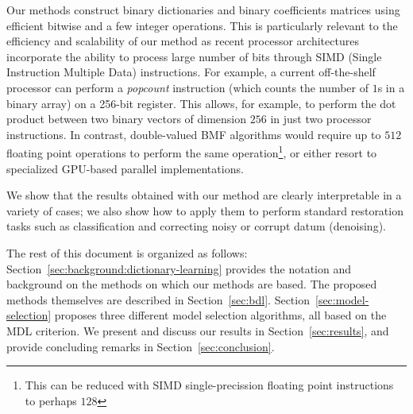 \documentclass[twocolumn]{IEEEtran}
\theoremstyle{definition}
\begin{document}
Our methods construct binary dictionaries and binary coefficients matrices using efficient bitwise and a few integer operations. This is particularly relevant to the efficiency and scalability of our method as recent processor architectures incorporate the ability to process large number of bits through SIMD (Single Instruction Multiple Data) instructions. For example, a current off-the-shelf processor can perform a \emph{popcount} instruction (which counts the number of $1$s in a binary array) on a 256-bit register. This allows, for example, to perform the dot product between two binary vectors of dimension $256$ in just two processor instructions. In contrast, double-valued BMF algorithms would require up to $512$ floating point operations to perform the same operation\footnote{This can be reduced with SIMD single-precission floating point instructions to perhaps $128$}, or either resort to specialized GPU-based parallel implementations.


We show that the results obtained with our method are clearly interpretable in a variety of cases; we also show how to apply them to perform standard restoration tasks such as classification and correcting noisy or corrupt datum (denoising).

The rest of this document is organized as follows: Section~\ref{sec:background:dictionary-learning} provides the notation and background on the methods on which our methods are based. The proposed methods themselves are described in Section~\ref{sec:bdl}.
Section~\ref{sec:model-selection} proposes three different model selection algorithms, all based on the MDL criterion. %
We present and discuss our results in Section~\ref{sec:results}, and provide concluding remarks in Section~\ref{sec:conclusion}.
\end{document}
